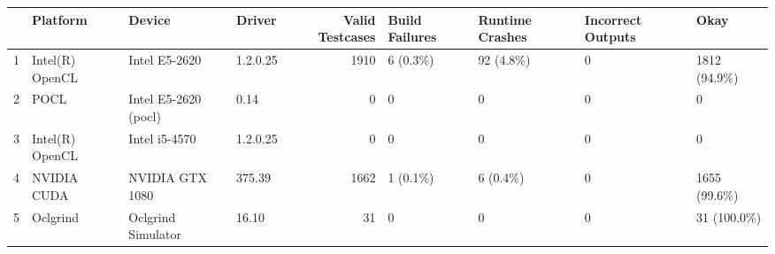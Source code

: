 \begin{tabular}{llllrllll}
\toprule
{} &         Platform &                Device &    Driver &  Valid Testcases & Build Failures & Runtime Crashes & Incorrect Outputs &          Okay \\
\midrule
1 &  Intel(R) OpenCL &         Intel E5-2620 &  1.2.0.25 &             1910 &       6 (0.3\%) &       92 (4.8\%) &                 0 &  1812 (94.9\%) \\
2 &             POCL &  Intel E5-2620 (pocl) &      0.14 &                0 &              0 &               0 &                 0 &             0 \\
3 &  Intel(R) OpenCL &         Intel i5-4570 &  1.2.0.25 &                0 &              0 &               0 &                 0 &             0 \\
4 &      NVIDIA CUDA &       NVIDIA GTX 1080 &    375.39 &             1662 &       1 (0.1\%) &        6 (0.4\%) &                 0 &  1655 (99.6\%) \\
5 &         Oclgrind &    Oclgrind Simulator &     16.10 &               31 &              0 &               0 &                 0 &   31 (100.0\%) \\
\bottomrule
\end{tabular}
